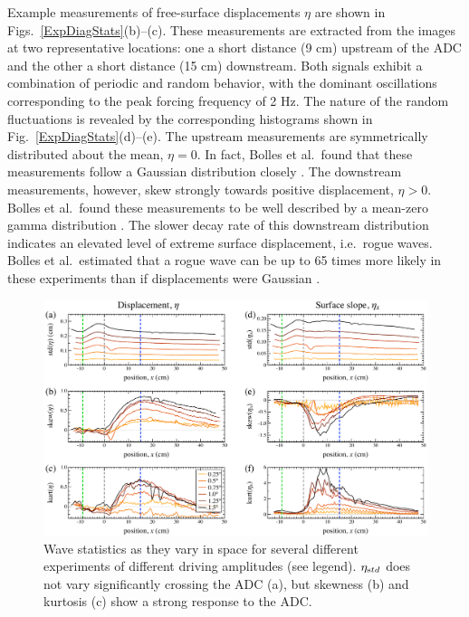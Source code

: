\documentclass[11pt]{article}
\newcommand{\etastd}{\eta_{\text std}}
\begin{document}
	Example measurements of free-surface displacements $\eta$ are shown in Figs.~\ref{ExpDiagStats}(b)--(c). These measurements are extracted from the images at two representative locations: one a short distance (9 cm) upstream of the ADC and the other a short distance (15 cm) downstream. Both signals exhibit a combination of periodic and random behavior, with the dominant oscillations corresponding to the peak forcing frequency of 2 Hz. The nature of the random fluctuations is revealed by the corresponding histograms shown in Fig.~\ref{ExpDiagStats}(d)--(e). The upstream measurements are symmetrically distributed about the mean, $\eta = 0$. In fact, Bolles et al.~found that these measurements follow a Gaussian distribution closely \cite{bolles2019}. The downstream measurements, however, skew strongly towards positive displacement, $\eta > 0$. Bolles et al.~found these measurements to be well described by a mean-zero gamma distribution \cite{bolles2019}. The slower decay rate of this downstream distribution indicates an elevated level of extreme surface displacement, i.e.~rogue waves. Bolles et al.~estimated that a rogue wave can be up to 65 times more likely in these experiments than if displacements were Gaussian \cite{bolles2019}. 

\begin{figure}%
\begin{center}
\includegraphics[width = 0.85 \linewidth]{Figs/ExpSpatialStats.pdf}
\caption{Wave statistics as they vary in space for several different experiments of different driving amplitudes (see legend). $\etastd$ does not vary significantly crossing the ADC (a), but skewness (b) and kurtosis (c) show a strong response to the ADC. }
\label{ExpSpatialStats}
\end{center}
\end{figure}
 
\end{document}
